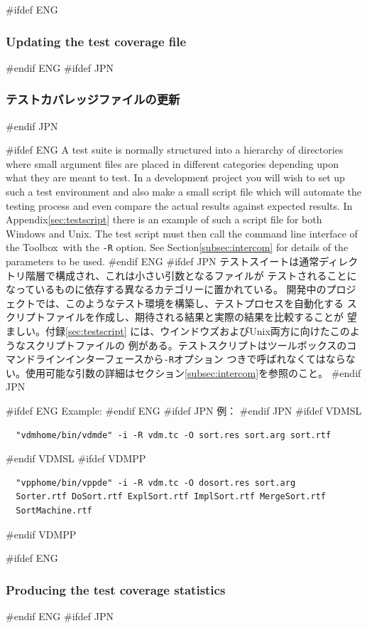 \documentclass[\pformat,12pt]{article}
\newcommand{\Toolbox}{Toolbox}
\newcommand{\Toolbox}{Toolbox}
\begin{document}
#ifdef ENG
\subsubsection{Updating the test coverage file}
#endif ENG
#ifdef JPN
\subsubsection{テストカバレッジファイルの更新}
#endif JPN

#ifdef ENG
A test suite is normally structured into a hierarchy of directories
where small argument files are placed in different categories
depending upon what they are meant to test.  In a development project
you will wish to set up such a test environment and also make
a small script file which will automate the testing process and even
compare the actual results against expected results. In
Appendix\ref{sec:testscript} 
there is an example of such a script file for both Windows and Unix.
The test script must then call the command line interface of the
\Toolbox\ with the {\tt -R} option. See Section\ref{subsec:intercom}
for details of the parameters to be used.
#endif ENG
#ifdef JPN
テストスイートは通常ディレクトリ階層で構成され、これは小さい引数となるファイルが
テストされることになっているものに依存する異なるカテゴリーに置かれている。
開発中のプロジェクトでは、このようなテスト環境を構築し、テストプロセスを自動化する
スクリプトファイルを作成し、期待される結果と実際の結果を比較することが
望ましい。付録\ref{sec:testscript} には、ウインドウズおよびUnix両方に向けたこのようなスクリプトファイルの
例がある。テストスクリプトはツールボックスのコマンドラインインターフェースから{\tt -R}オプション
つきで呼ばれなくてはならない。使用可能な引数の詳細はセクション\ref{subsec:intercom}を参照のこと。
#endif JPN

#ifdef ENG
Example:
#endif ENG
#ifdef JPN
例：
#endif JPN
#ifdef VDMSL
\begin{verbatim}
  "vdmhome/bin/vdmde" -i -R vdm.tc -O sort.res sort.arg sort.rtf
\end{verbatim}
#endif VDMSL
#ifdef VDMPP
\begin{verbatim}
  "vpphome/bin/vppde" -i -R vdm.tc -O dosort.res sort.arg 
  Sorter.rtf DoSort.rtf ExplSort.rtf ImplSort.rtf MergeSort.rtf 
  SortMachine.rtf 
\end{verbatim}
#endif VDMPP

#ifdef ENG
\subsubsection{Producing the test coverage statistics}
#endif ENG
#ifdef JPN
\end{document}
